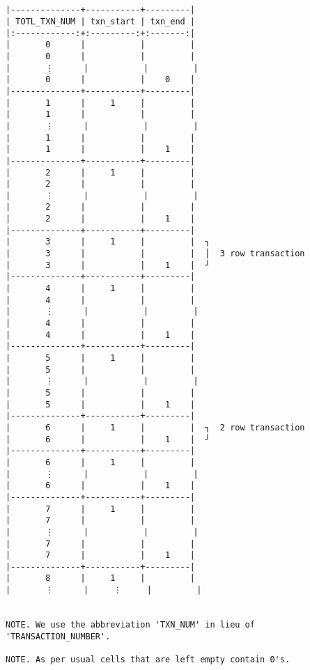 \documentclass[varwidth=\maxdimen,margin=0.5cm,multi={verbatim}]{standalone}
\begin{document}
\begin{verbatim}


|--------------+-----------+---------|
| TOTL_TXN_NUM | txn_start | txn_end |
|:------------:+:---------:+:-------:|
|       0      |           |         |
|       0      |           |         |
|       ⋮      |           |         |
|       0      |           |    0    |
|--------------+-----------+---------|
|       1      |     1     |         |
|       1      |           |         |
|       ⋮      |           |         |
|       1      |           |         |
|       1      |           |    1    |
|--------------+-----------+---------|
|       2      |     1     |         |
|       2      |           |         |
|       ⋮      |           |         |
|       2      |           |         |
|       2      |           |    1    |
|--------------+-----------+---------|
|       3      |     1     |         |  ┐
|       3      |           |         |  │  3 row transaction
|       3      |           |    1    |  ┘
|--------------+-----------+---------|
|       4      |     1     |         |
|       4      |           |         |
|       ⋮      |           |         |
|       4      |           |         |
|       4      |           |    1    |
|--------------+-----------+---------|
|       5      |     1     |         |
|       5      |           |         |
|       ⋮      |           |         |
|       5      |           |         |
|       5      |           |    1    |
|--------------+-----------+---------|
|       6      |     1     |         |  ┐  2 row transaction
|       6      |           |    1    |  ┘
|--------------+-----------+---------|  
|       6      |     1     |         |
|       ⋮      |           |         |
|       6      |           |    1    |
|--------------+-----------+---------|
|       7      |     1     |         |
|       7      |           |         |
|       ⋮      |           |         |
|       7      |           |         |
|       7      |           |    1    |
|--------------+-----------+---------|
|       8      |     1     |         |
|       ⋮      |     ⋮     |         |


NOTE. We use the abbreviation 'TXN_NUM' in lieu of 'TRANSACTION_NUMBER'.

NOTE. As per usual cells that are left empty contain 0's.

\end{verbatim}
\end{document}
